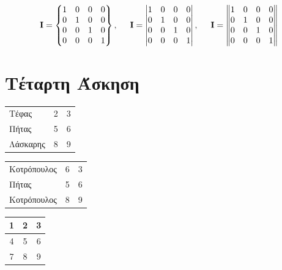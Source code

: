 \documentclass{article}
\begin{document}
\begin{equation}
    \textbf{I} = \begin{Bmatrix}
            1 & 0 & 0 & 0\\
            0 & 1 & 0 & 0\\
            0 & 0 & 1 & 0\\
            0 & 0 & 0 & 1
        \end{Bmatrix}, \hspace{0.5cm}
    \textbf{I} = \begin{vmatrix}
            1 & 0 & 0 & 0\\
            0 & 1 & 0 & 0\\
            0 & 0 & 1 & 0\\
            0 & 0 & 0 & 1
        \end{vmatrix}, \hspace{0.5cm}
    \textbf{I} = \begin{Vmatrix}
            1 & 0 & 0 & 0\\
            0 & 1 & 0 & 0\\
            0 & 0 & 1 & 0\\
            0 & 0 & 0 & 1
        \end{Vmatrix}
\end{equation}


\section{Τέταρτη Άσκηση}

\begin{center}
\begin{tabular}{ l l l }
 Τέφας    & 2 & 3 \\ 
 Πήτας    & 5 & 6 \\
 Λάσκαρης & 8 & 9    
\end{tabular}
\end{center}

\begin{center}
\begin{tabular}{ | l | l | l |}
 Κοτρόπουλος    & 6 & 3 \\ 
 Πήτας          & 5 & 6 \\
 Κοτρόπουλος    & 8 & 9    
\end{tabular}
\end{center}

\begin{center}
\begin{tabular}{ | c | c | c |}
 \hline
 1 & 2 & 3 \\ \hline
 4 & 5 & 6 \\ \hline
 7 & 8 & 9 \\ \hline
\end{tabular}
\end{center}
\end{document}
